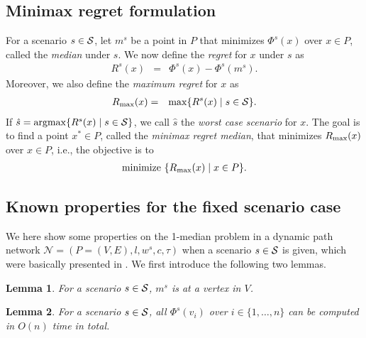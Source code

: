\documentclass[a4paper]{llncs}
\newcommand{\argmax}{\operatornamewithlimits{argmax}}
\newtheorem{lem}{Lemma}
\begin{document}
\subsection{Minimax regret formulation}
\label{subsec:mi}
For a scenario $s \in {\cal S}$, let $m^s$ be a point in $P$ that minimizes $\Phi^s(x)$ over $x \in P$, called the {\it median} under $s$. 
We now define the {\it regret} for $x$ under $s$ as
\begin{eqnarray}
R^s(x) &=&  \Phi^s(x) - \Phi^s(m^s).
\label{eq:rg}
\end{eqnarray}
Moreover, we also define the {\it maximum regret} for $x$ as
\begin{eqnarray}
R_{\rm max}(x) &=& \max \{ R^s(x) \mid s \in \mathcal{S} \}.
\label{eq:rmax}
\end{eqnarray}
If $\hat{s} = \argmax \{ R^s(x) \mid s \in \mathcal{S} \}$, 
we call $\hat{s}$ the {\it worst case scenario} for $x$.
The goal is to find a point $x^* \in P$, called the {\it minimax regret median}, that minimizes $R_{\rm max}(x)$ over $x \in P$,
i.e., the objective is to
\begin{eqnarray}
{\rm minimize} \ \{ R_{\rm max}(x) \mid x \in P\}.
\label{eq:objective}
\end{eqnarray}




\subsection{Known properties for the fixed scenario case}
\label{subsec:kp}
We here show some properties on the 1-median problem in a dynamic path network $\mathcal{N} = (P = (V, E), l, w^s, c, \tau)$ when a scenario $s \in {\cal S}$ is given, which were basically presented in \cite{hgk14_2,hgk14_4}.
We first introduce the following two lemmas.


\begin{lem}
For a scenario $s \in {\cal S}$, $m^s$ is at a vertex in $V$.
\label{lem:ms}
\end{lem}



\begin{lem}
For a scenario $s \in {\cal S}$, all $\Phi^s(v_i)$ over $i \in \{1, \ldots, n\}$ can be computed in $O(n)$ time in total.
\label{lem:pht}
\end{lem}
\end{document}
